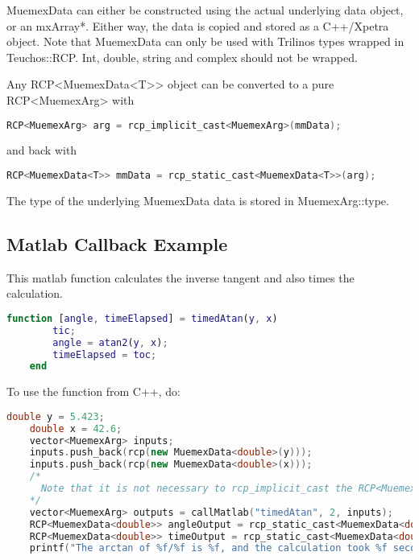 MuemexData can either be constructed using the actual underlying data object, or an mxArray*. Either
way, the data is copied and stored as a C++/Xpetra object. Note that MuemexData can only be used with Trilinos
types wrapped in Teuchos::RCP. Int, double, string and complex should not be wrapped.

Any RCP<MuemexData<T>> object can be converted to a pure RCP<MuemexArg> with

\begin{lstlisting}[language=C++]
    RCP<MuemexArg> arg = rcp_implicit_cast<MuemexArg>(mmData);
\end{lstlisting}

and back with

\begin{lstlisting}[language=C++]
    RCP<MuemexData<T>> mmData = rcp_static_cast<MuemexData<T>>(arg);
\end{lstlisting}

The type of the underlying MuemexData data is stored in MuemexArg::type.

\subsection{Matlab Callback Example}

This matlab function calculates the inverse tangent and also times the calculation.

\begin{lstlisting}[language=Matlab]
    function [angle, timeElapsed] = timedAtan(y, x)
        tic;
        angle = atan2(y, x);
        timeElapsed = toc;
    end
\end{lstlisting}

To use the function from C++, do:

\begin{lstlisting}[language=C++]
    double y = 5.423;
    double x = 42.6;
    vector<MuemexArg> inputs;
    inputs.push_back(rcp(new MuemexData<double>(y)));                                      //add the first argument (y)
    inputs.push_back(rcp(new MuemexData<double>(x)));                                      //add the second argument (x)
    /*
      Note that it is not necessary to rcp_implicit_cast the RCP<MuemexData> objects when adding them to MuemexArg vector - this happens implicitly
    */
    vector<MuemexArg> outputs = callMatlab("timedAtan", 2, inputs);                        //call the function, expect 2 outputs
    RCP<MuemexData<double>> angleOutput = rcp_static_cast<MuemexData<double>>(outputs[0]); //recover the outputs, knowing both have type "double"
    RCP<MuemexData<double>> timeOutput = rcp_static_cast<MuemexData<double>>(outputs[1]);
    printf("The arctan of %f/%f is %f, and the calculation took %f seconds.", y, x, angleOutput->getData(), timeOutput->getData());
\end{lstlisting}


